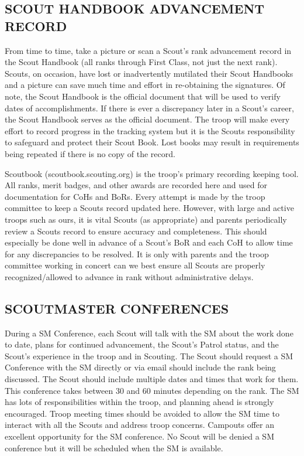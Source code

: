 \documentclass{ltxguide}
\begin{document}
\subsection{SCOUT HANDBOOK ADVANCEMENT RECORD}
From time to time, take a picture or scan a Scout's rank advancement record in the Scout Handbook (all ranks through First Class, not just the next rank). Scouts, on occasion, have lost or inadvertently mutilated their Scout Handbooks and a picture can save much time and effort in re-obtaining the signatures. Of note, the Scout Handbook is the official document that will be used to verify dates of accomplishments. If there is ever a discrepancy later in a Scout's career, the Scout Handbook serves as the official document. The troop will make every effort to record progress in the tracking system but it is the Scouts responsibility to safeguard and protect their Scout Book. Lost books may result in requirements being repeated if there is no copy of the record.

Scoutbook (scoutbook.scouting.org) is the troop's primary recording keeping tool. All ranks, merit badges, and other awards are recorded here and used for documentation for \acp{CoH} and \acp{BoR}. Every attempt is made by the troop committee to keep a Scouts record updated here.  However, with large and active troops such as ours, it is vital Scouts (as appropriate) and parents periodically review a Scouts record to ensure accuracy and completeness.  This should especially be done well in advance of a Scout's \ac{BoR} and each \ac{CoH} to allow time for any discrepancies to be resolved. It is only with parents and the troop committee working in concert can we best ensure all Scouts are properly recognized/allowed to advance in rank without administrative delays.

\subsection{SCOUTMASTER CONFERENCES}
During a \ac{SM} Conference, each Scout will talk with the \ac{SM} about the work done to date, plans for continued advancement, the Scout's Patrol status, and the Scout's experience in the troop and in Scouting. The Scout should request a \ac{SM} Conference with the \ac{SM} directly or via email should include the rank being discussed. The Scout should include multiple dates and times that work for them. This conference  takes between 30 and 60 minutes depending on the rank. The \ac{SM} has lots of responsibilities within the troop, and planning ahead is strongly encouraged. Troop meeting times should be avoided to allow the \ac{SM} time to interact with all the Scouts and address troop concerns. Campouts offer an excellent opportunity for the \ac{SM} conference. No Scout will be denied a SM conference but it will be scheduled when the SM is available.
\end{document}
